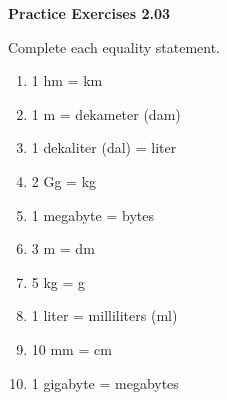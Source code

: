 \vspace{0.3ex}
\noindent\textbf{Practice Exercises 2.03}

\vspace{0.2ex}

Complete each equality statement.
\begin{multicols}{2}
\begin{enumerate}[noitemsep, label = \color{blue}\arabic*. ]
\item 1 hm = \underline{\hspace{2em}} km
\item 1 m = \underline{\hspace{2em}} dekameter (dam)
\item 1 dekaliter (dal) = \underline{\hspace{2em}} liter 
\item 2 Gg = \underline{\hspace{2em}} kg
\item 1 megabyte = \underline{\hspace{2em}} bytes
\item 3 m = \underline{\hspace{2em}} dm
    \item 5 kg = \underline{\hspace{2em}} g
    \item 1 liter = \underline{\hspace{2em}} milliliters (ml)
    \item 10 mm = \underline{\hspace{2em}} cm
    \item 1 gigabyte = \underline{\hspace{2em}} megabytes
\end{enumerate}
\end{multicols}
